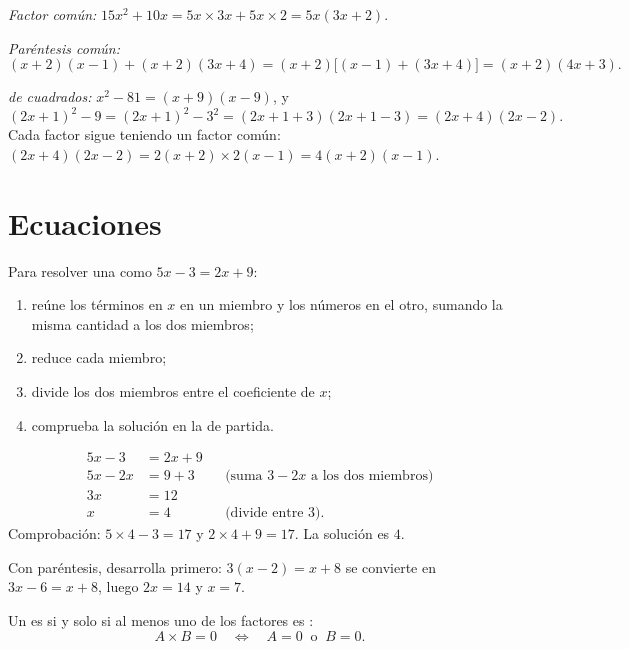 \begin{example}\label{ex:g9:algebra:factor}
\emph{Factor común:}
$15x^2 + 10x = 5x \times 3x + 5x \times 2 = 5x(3x + 2)$.

\emph{Paréntesis común:}
\[
(x+2)(x-1) + (x+2)(3x+4) = (x+2)\bigl[(x-1) + (3x+4)\bigr]
= (x+2)(4x+3).
\]

\emph{ de cuadrados:}
$x^2 - 81 = (x+9)(x-9)$, y
\[
(2x+1)^2 - 9 = (2x+1)^2 - 3^2 = (2x+1+3)(2x+1-3) = (2x+4)(2x-2).
\]
Cada factor sigue teniendo un factor común: $(2x+4)(2x-2) = 2(x+2) \times
2(x-1) = 4(x+2)(x-1)$.
\end{example}

\section{Ecuaciones}

\begin{method}\label{met:g9:algebra:firstdegree}
Para resolver una  como $5x - 3 = 2x + 9$:
\begin{enumerate}
  \item reúne los términos en $x$ en un miembro y los números en el otro,
        sumando la misma cantidad a los dos miembros;
  \item reduce cada miembro;
  \item divide los dos miembros entre el coeficiente de $x$;
  \item comprueba la solución en la  de partida.
\end{enumerate}
\end{method}

\begin{example}\label{ex:g9:algebra:firstdegree}
\begin{align*}
5x - 3 &= 2x + 9 \\
5x - 2x &= 9 + 3 && \text{(suma $3 - 2x$ a los dos miembros)}\\
3x &= 12 \\
x &= 4 && \text{(divide entre 3).}
\end{align*}
Comprobación: $5 \times 4 - 3 = 17$ y $2 \times 4 + 9 = 17$. La solución es
$4$.

Con paréntesis, desarrolla primero: $3(x - 2) = x + 8$ se convierte en $3x - 6 = x + 8$,
luego $2x = 14$ y $x = 7$.
\end{example}

\begin{theorem}\label{thm:g9:algebra:zeroproduct}
Un  es  si y solo si al menos uno de los factores es :
\[
A \times B = 0
\quad\Longleftrightarrow\quad
A = 0 \ \text{ o } \ B = 0 .
\]
\end{theorem}

